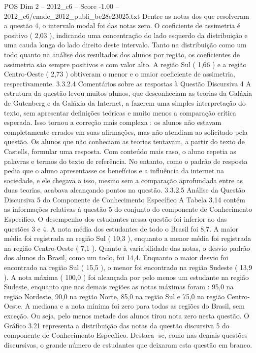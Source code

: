 \begin{textsample}{POS Dim 2 – 2012\_c6 – Score -1.00 – 2012\_c6/enade\_2012\_publi\_bc28e23025.txt}
Dentre as notas dos que resolveram a questão 4, o intervalo modal foi das notas zero.
O coeficiente de assimetria é positivo ( 2,03 ), indicando uma concentração do lado esquerdo da distribuição e uma cauda longa do lado direito deste intervalo.
Tanto na distribuição como um todo quanto na análise dos resultados dos alunos por região, os coeficientes de assimetria são sempre positivos e com valor alto.
A região Sul ( 1,66 ) e a região Centro-Oeste ( 2,73 ) obtiveram o menor e o maior coeficiente de assimetria, respectivamente. 3.3.2.4 Comentários sobre as respostas à Questão Discursiva 4 A estrutura da questão levou muitos alunos, que desconheciam as teorias da Galáxia de Gutenberg e da Galáxia da Internet, a fazerem uma simples interpretação do texto, sem apresentar definições teóricas e muito menos a comparação crítica esperada.
Isso tornou a correção mais complexa : os alunos não estavam completamente errados em suas afirmações, mas não atendiam ao solicitado pela questão.
Os alunos que não conheciam as teorias tentavam, a partir do texto de Castells, formular uma resposta.
Com conteúdo mais raso, o aluno repetia as palavras e termos do texto de referência.
No entanto, como o padrão de resposta pedia que o aluno apresentasse os benefícios e a influência da internet na sociedade, e ele chegava a isso, mesmo sem a comparação aprofundada entre as duas teorias, acabava alcançando pontos na questão. 3.3.2.5 Análise da Questão Discursiva 5 do Componente de Conhecimento Específico A Tabela 3.14 contém as informações relativas à questão 5 do conjunto do componente de Conhecimento Específico.
O desempenho dos estudantes nessa questão foi inferior ao das questões 3 e 4.
A nota média dos estudantes de todo o Brasil foi 8,7.
A maior média foi registrada na região Sul ( 10,3 ), enquanto a menor média foi registrada na região Centro-Oeste ( 7,1 ).
Quanto à variabilidade das notas, o desvio padrão dos alunos do Brasil, como um todo, foi 14,4.
Enquanto o maior desvio foi encontrado na região Sul ( 15,5 ), o menor foi encontrado na região Sudeste ( 13,9 ).
A nota máxima ( 100,0 ) foi alcançada por pelo menos um estudante na região Sudeste, enquanto que nas demais regiões as notas máximas foram : 95,0 na região Nordeste, 90,0 na região Norte, 85,0 na região Sul e 75,0 na região Centro-Oeste.
A mediana e a nota mínima foi zero para todas as regiões do Brasil, sem exceção.
Ou seja, pelo menos metade dos alunos tirou nota zero nesta questão.
O Gráfico 3.21 representa a distribuição das notas da questão discursiva 5 do componente de Conhecimento Específico.
Destaca -se, como nas demais questões discursivas, o grande número de estudantes que deixaram esta questão em branco.

\end{textsample}
